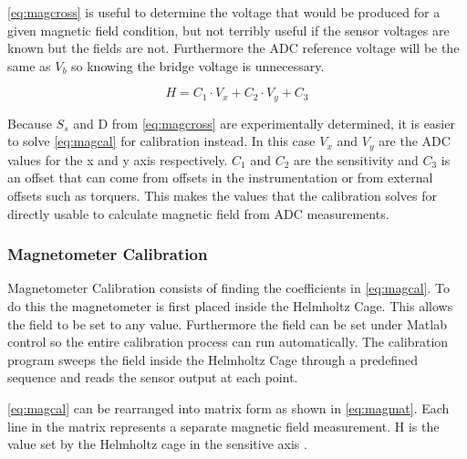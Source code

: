 \autoref{eq:magcross} is useful to determine the voltage that would be produced for a given magnetic field condition, but not terribly useful if the sensor voltages are known but the fields are not. Furthermore the \ac{ADC} reference voltage will be the same as $V_b$ so knowing the bridge voltage is unnecessary. 
 
\begin{equation}
    H = C_1 \cdot V_x + C_2 \cdot V_y + C_3
    \label{eq:magcal}
\end{equation}

Because $S_s$ and D from \autoref{eq:magcross} are experimentally determined, it is easier to solve \autoref{eq:magcal} for calibration instead. In this case $V_x$ and $V_y$ are the \ac{ADC} values for the x and y axis respectively. $C_1$ and $C_2$ are the sensitivity and $C_3$ is an offset that can come from offsets in the instrumentation or from external offsets such as torquers. This makes the values that the calibration solves for directly usable to calculate magnetic field from \ac{ADC} measurements.

\subsubsection{Magnetometer Calibration}

Magnetometer Calibration consists of finding the coefficients in \autoref{eq:magcal}. To do this the magnetometer is first placed inside the Helmholtz Cage. This allows the field to be set to any value. Furthermore the field can be set under Matlab control so the entire calibration process can run automatically. The calibration program sweeps the field inside the Helmholtz Cage through a predefined sequence and reads the sensor output at each point. 

\vspace{2em}
\autoref{eq:magcal} can be rearranged into matrix form as shown in \autoref{eq:magmat}. Each line in the matrix represents a separate magnetic field measurement. H is the value set by the Helmholtz cage in the sensitive axis . 

